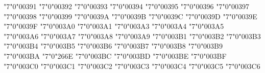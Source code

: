 \def\overbar{\maccent"7"0"00305 }
\def\breve{\maccent"7"0"00306 }
\def\dot{\maccent"7"0"00307 }
\def\ddot{\maccent"7"0"00308 }
\def\ovhook{\maccent"7"0"00309 }
\def\ocirc{\maccent"7"0"0030A }
\def\H{\maccent"7"0"0030B }
\def\check{\maccent"7"0"0030C }
\def\widecheck{\maccent"7"0"0030C }
\def\candra{\maccent"7"0"00310 }
\def\oturnedcomma{\maccent"7"0"00312 }
\def\osmooth{\maccent"7"0"00313 }
\def\orough{\maccent"7"0"00314 }
\def\ocommatopright{\maccent"7"0"00315 }
\def\droang{\maccent"7"0"0031A }
\def\d{\maccent"7"0"00323 }
\def\c{\maccent"7"0"00327 }
\def\k{\maccent"7"0"00328 }
\def\undertilde{\maccent"7"0"00330 }
\def\wideutilde{\maccent"7"0"00330 }
\let\wideundertilde\wideutilde
\def\b{\maccent"7"0"00331 }
\def\underbar{\maccent"7"0"00331 }
\let\b\underbar
\def\not{\maccent"7"0"00338 }
\def\t{\maccent"7"0"00361 }
\mchardef\upAlpha"7"0"00391
\mchardef\upBeta"7"0"00392
\mchardef\upGamma"7"0"00393
\let\Gamma\upGamma
\mchardef\upDelta"7"0"00394
\let\Delta\upDelta
\mchardef\upEpsilon"7"0"00395
\mchardef\upZeta"7"0"00396
\mchardef\upEta"7"0"00397
\mchardef\upTheta"7"0"00398
\let\Theta\upTheta
\mchardef\upIota"7"0"00399
\mchardef\upKappa"7"0"0039A
\mchardef\upLambda"7"0"0039B
\let\Lambda\upLambda
\mchardef\upMu"7"0"0039C
\mchardef\upNu"7"0"0039D
\mchardef\upXi"7"0"0039E
\let\Xi\upXi
\mchardef\upOmicron"7"0"0039F
\mchardef\upPi"7"0"003A0
\let\Pi\upPi
\mchardef\upRho"7"0"003A1
\mchardef\upSigma"7"0"003A3
\let\Sigma\upSigma
\mchardef\upTau"7"0"003A4
\mchardef\upUpsilon"7"0"003A5
\mchardef\upPhi"7"0"003A6
\let\Phi\upPhi
\mchardef\upChi"7"0"003A7
\mchardef\upPsi"7"0"003A8
\let\Psi\upPsi
\mchardef\upOmega"7"0"003A9
\let\Omega\upOmega
\mchardef\upalpha"7"0"003B1
\let\alpha\upalpha
\mchardef\upbeta"7"0"003B2
\let\beta\upbeta
\mchardef\upgamma"7"0"003B3
\let\gamma\upgamma
\mchardef\updelta"7"0"003B4
\let\delta\updelta
\mchardef\upvarepsilon"7"0"003B5
\let\varepsilon\upvarepsilon
\mchardef\upzeta"7"0"003B6
\let\zeta\upzeta
\mchardef\upeta"7"0"003B7
\let\eta\upeta
\mchardef\uptheta"7"0"003B8
\let\theta\uptheta
\mchardef\upiota"7"0"003B9
\let\iota\upiota
\mchardef\upkappa"7"0"003BA
\let\kappa\upkappa
\mchardef\uplambda"7"0"266E
\let\lambda\uplambda
\mchardef\upmu"7"0"003BC
\let\mu\upmu
\mchardef\upnu"7"0"003BD
\let\nu\upnu
\mchardef\upxi"7"0"003BE
\let\xi\upxi
\mchardef\upomicron"7"0"003BF
\mchardef\uppi"7"0"003C0
\let\pi\uppi
\mchardef\uprho"7"0"003C1
\let\rho\uprho
\mchardef\upvarsigma"7"0"003C2
\let\varsigma\upvarsigma
\mchardef\upsigma"7"0"003C3
\let\sigma\upsigma
\mchardef\uptau"7"0"003C4
\let\tau\uptau
\mchardef\upupsilon"7"0"003C5
\let\upsilon\upupsilon
\mchardef\upvarphi"7"0"003C6
